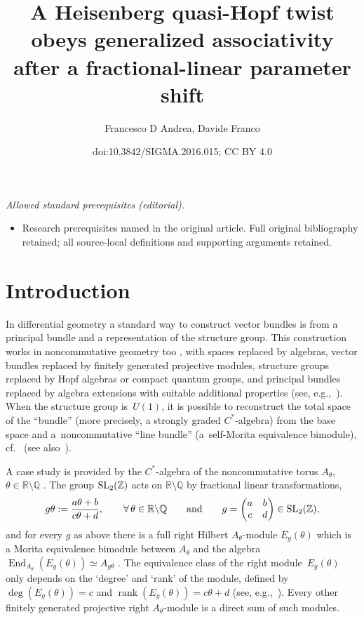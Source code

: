 \documentclass[10pt,a4paper]{amsart}
\title{A Heisenberg quasi-Hopf twist obeys generalized associativity after a fractional-linear parameter shift}
\author{Francesco D Andrea, Davide Franco}
\date{doi:10.3842/SIGMA.2016.015; CC BY 4.0}
\numberwithin{equation}{section}
\theoremstyle{definition}
\newcommand{\Q}{\mathbb{Q}}
\newcommand{\R}{\mathbb{R}}
\newcommand{\Z}{\mathbb{Z}}
\begin{document}
\maketitle
\noindent\textit{Allowed standard prerequisites (editorial).}\begin{itemize}
\item Research prerequisites named in the original article. Full original bibliography retained; all source-local definitions and supporting arguments retained.
\end{itemize}\medskip
\section{Introduction}

In dif\/ferential geometry a standard way to construct vector bundles is from a principal bundle and a representation of the structure group. This construction works in noncommutative geometry too \cite{Con94,GVF01,Lan02}, with spaces replaced by algebras, vector bundles replaced by f\/initely generated projective modules, structure groups replaced by Hopf algebras or compact quantum groups, and principal bundles replaced by algebra extensions with suitable additional properties (see, e.g.,~\cite{BM92,Haj96}). When the structure group is~$U(1)$, it is possible to reconstruct the total space of the ``bundle'' (more precisely, a strongly graded $C^*$-algebra) from the base space and a~noncommutative ``line bundle'' (a~self-Morita equivalence bimodule), cf.~\cite{AKL14} (see also~\cite{ADL15,D15}).

A case study is provided by the $C^*$-algebra of the noncommutative torus $A_\theta$, $\theta\in\R{\setminus}\Q$ \cite{Con80,Rie81}.
The group ${\rm SL}_2(\Z)$ acts on $\R{\setminus}\Q$ by fractional linear transformations,
\begin{gather}\label{eq:gtheta}
g\theta :=\frac{a\theta+b}{c\theta+d}
 ,\qquad\forall\,\theta\in\R{\setminus}\Q
\qquad\text{and}\qquad g=
 \begin{pmatrix} a & b \\ c & d \end{pmatrix}
\in {\rm SL}_2(\Z) ,
\end{gather}
and for every $g$ as above there is a full right Hilbert $A_\theta$-module $E_g(\theta)$ which is a Morita equiva\-len\-ce bimodule between $A_\theta$ and the algebra $\operatorname{End}_{A_\theta}(E_g(\theta))\simeq A_{g\theta}$ \cite{Con80,Rie83}.
The equivalence class of the right module~$E_g(\theta)$ only depends on the `degree' and `rank' of the module, def\/ined by
$\deg (E_g(\theta))=c$ and $\operatorname{rank}(E_g(\theta))=c\theta+d$ (see, e.g.,~\cite{PS02}). Every other f\/initely generated projective right $A_\theta$-module is a direct sum of such modules.
\end{document}
